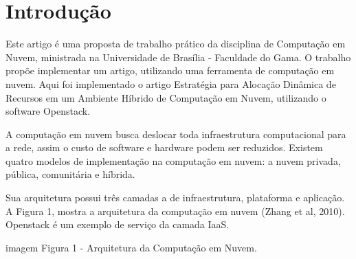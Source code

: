 \chapter[Introdução]{Introdução}\label{cap1}

Este artigo é uma proposta de trabalho prático da disciplina de Computação em Nuvem, ministrada na Universidade de Brasília - Faculdade do Gama. O trabalho propõe implementar um artigo, utilizando uma ferramenta de computação em nuvem. Aqui foi implementado o artigo Estratégia para Alocação Dinâmica de Recursos em um Ambiente Híbrido de Computação em Nuvem, utilizando o software Openstack.

A computação em nuvem busca deslocar toda infraestrutura computacional para a rede, assim o custo de software e hardware podem ser reduzidos. Existem quatro modelos de implementação na computação em nuvem: a nuvem privada, pública, comunitária e híbrida.

Sua arquitetura possui   três camadas a de infraestrutura, plataforma e aplicação. A Figura 1, mostra a arquitetura da computação em nuvem (Zhang et al, 2010). Openstack é um exemplo de serviço da camada IaaS.

imagem Figura 1 - Arquitetura da Computação em Nuvem.
